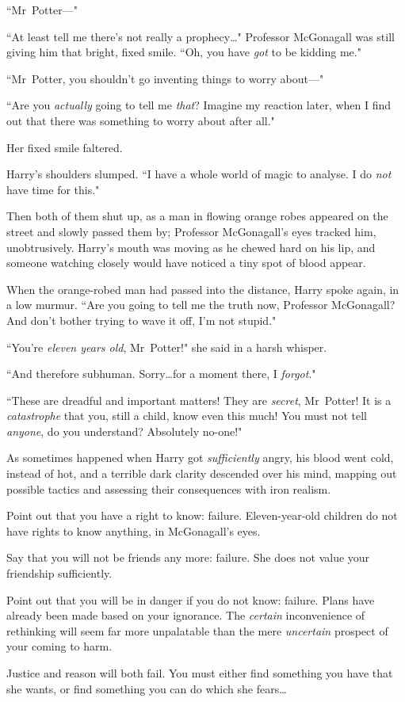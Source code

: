 ``Mr~Potter—"

``At least tell me there's not really a prophecy…" Professor McGonagall was still giving him that bright, fixed smile. ``Oh, you have \emph{got} to be kidding me."

``Mr~Potter, you shouldn't go inventing things to worry about—"

``Are you \emph{actually} going to tell me \emph{that}? Imagine my reaction later, when I find out that there was something to worry about after all."

Her fixed smile faltered.

Harry's shoulders slumped. ``I have a whole world of magic to analyse. I do \emph{not} have time for this."

Then both of them shut up, as a man in flowing orange robes appeared on the street and slowly passed them by; Professor McGonagall's eyes tracked him, unobtrusively. Harry's mouth was moving as he chewed hard on his lip, and someone watching closely would have noticed a tiny spot of blood appear.

When the orange-robed man had passed into the distance, Harry spoke again, in a low murmur. ``Are you going to tell me the truth now, Professor McGonagall? And don't bother trying to wave it off, I'm not stupid."

``You're \emph{eleven years old}, Mr~Potter!" she said in a harsh whisper.

``And therefore subhuman. Sorry…for a moment there, I \emph{forgot}."

``These are dreadful and important matters! They are \emph{secret}, Mr~Potter! It is a \emph{catastrophe} that you, still a child, know even this much! You must not tell \emph{anyone}, do you understand? Absolutely no-one!"

As sometimes happened when Harry got \emph{sufficiently} angry, his blood went cold, instead of hot, and a terrible dark clarity descended over his mind, mapping out possible tactics and assessing their consequences with iron realism.

\begin{em}
Point out that you have a right to know: failure. Eleven-year-old children do not have rights to know anything, in McGonagall's eyes.

Say that you will not be friends any more: failure. She does not value your friendship sufficiently.

Point out that you will be in danger if you do not know: failure. Plans have already been made based on your ignorance. The \emph{certain} inconvenience of rethinking will seem far more unpalatable than the mere \emph{uncertain} prospect of your coming to harm.

Justice and reason will both fail. You must either find something you have that she wants, or find something you can do which she fears…
\end{em}


